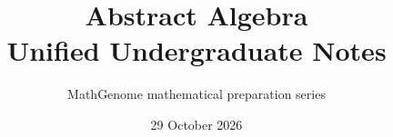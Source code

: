 \documentclass[11pt,oneside,a4paper]{book}
\begin{document}
\frontmatter
\title{Abstract Algebra\\Unified Undergraduate Notes}
\author{MathGenome mathematical preparation series}
\date{29 October 2026}
\maketitle

\tableofcontents
\mainmatter
























\appendix




\end{document}
